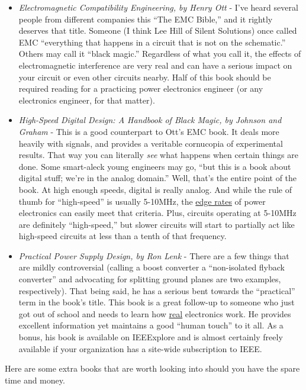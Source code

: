 \begin{itemize}
\item \emph{Electromagnetic Compatibility Engineering, by Henry Ott} - I've heard several people from different companies this ``The EMC Bible,'' and it rightly deserves that title. Someone (I think Lee Hill of Silent Solutions) once called EMC ``everything that happens in a circuit that is not on the schematic.'' Others may call it ``black magic.'' Regardless of what you call it, the effects of electromagnetic interference are very real and can have a serious impact on your circuit or even other circuits nearby. Half of this book should be required reading for a practicing power electronics engineer (or any electronics engineer, for that matter).

\item \emph{High-Speed Digital Design: A Handbook of Black Magic, by Johnson and Graham} - This is a good counterpart to Ott's EMC book. It deals more heavily with signals, and provides a veritable cornucopia of experimental results. That way you can literally \emph{see} what happens when certain things are done. Some smart-aleck young engineers may go, ``but this is a book about digital stuff; we're in the analog domain.'' Well, that's the entire point of the book. At high enough speeds, digital is really analog. And while the rule of thumb for ``high-speed'' is usually 5-10MHz, the \underline{edge rates} of power electronics can easily meet that criteria. Plus, circuits operating at 5-10MHz are definitely ``high-speed,'' but slower circuits will start to partially act like high-speed circuits at less than a tenth of that frequency.

\item \emph{Practical Power Supply Design, by Ron Lenk} - There are a few things that are mildly controversial (calling a boost converter a ``non-isolated flyback converter'' and advocating for splitting ground planes are two examples, respectively). That being said, he has a serious bent towards the ``practical'' term in the book's title. This book is a great follow-up to someone who just got out of school and needs to learn how \underline{real} electronics work. He provides excellent information yet maintains a good ``human touch'' to it all. As a bonus, his book is available on IEEExplore and is almost certainly freely available if your organization has a site-wide subscription to IEEE.

\end{itemize}

Here are some extra books that are worth looking into should you have the spare time and money.

